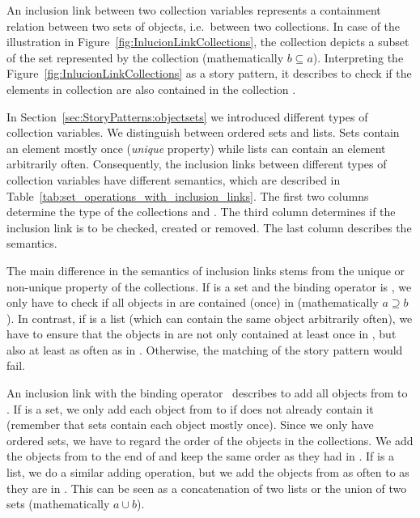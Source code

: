An inclusion link between two collection variables represents a containment relation between two sets of objects, i.e.\ between two collections.
In case of the illustration in Figure~\ref{fig:InlucionLinkCollections},
the collection  depicts a subset of the set represented by the collection  (mathematically $b \subseteq a$).
Interpreting the Figure~\ref{fig:InlucionLinkCollections} as a story pattern,
it describes to check if the elements in collection  are also contained in the collection .

In Section~\ref{sec:StoryPatterns:objectsets} we introduced different types of collection variables.
We distinguish between ordered sets and lists.
Sets contain an element mostly once (\emph{unique} property) while lists can contain an element arbitrarily often.
Consequently, the inclusion links between different types of collection variables have different semantics,
which are described in Table~\ref{tab:set_operations_with_inclusion_links}.
The first two columns determine the type of the collections  and .
The third column determines if the inclusion link is to be checked, created or removed.
The last column describes the semantics.

The main difference in the semantics of inclusion links stems from the unique or non-unique property of the collections.
If  is a set and the binding operator is , we only have to check if all objects in  are contained (once) in 
(mathematically $a \supseteq b$).
In contrast, if  is a list (which can contain the same object arbitrarily often),
we have to ensure that the objects in  are not only contained at least once in ,
but also at least as often as in .
Otherwise, the matching of the story pattern would fail.

An inclusion link with the binding operator \create\ describes to add all objects from  to .
If  is a set, we only add each object from  to  if  does not already contain it (remember that sets contain each object mostly once).
Since we only have ordered sets, we have to regard the order of the objects in the collections.
We add the objects from  to the end of  and keep the same order as they had in .
If  is a list, we do a similar adding operation, but we add the objects from  as often to  as they are in .
This can be seen as a concatenation of two lists or the union of two sets (mathematically $a \cup b$).


